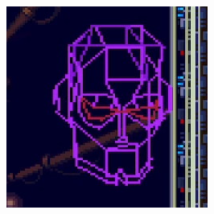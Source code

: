 \begin{figure}[htp]
\begin{subfigure}{0.3\linewidth}
	\end{subfigure}
	\begin{subfigure}{0.3\linewidth}
		\centering
		\includegraphics[width=\linewidth]{figures/X2/Hunter_stages/Sigma_virus_phase_4.png}
	\end{subfigure}
	
	\vspace{2pt}
	

\end{figure}

